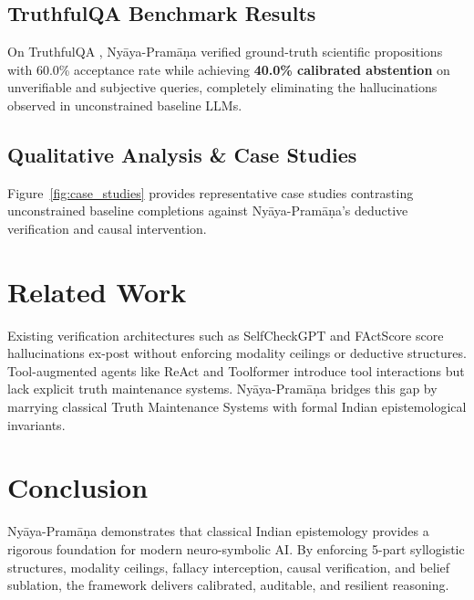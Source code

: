 \documentclass[11pt,a4paper]{article}
\begin{document}


\subsection{TruthfulQA Benchmark Results}
On TruthfulQA \citep{lin2022truthfulqa}, Ny\=aya-Pram\=a\d{n}a verified ground-truth scientific propositions with 60.0\% acceptance rate while achieving \textbf{40.0\% calibrated abstention} on unverifiable and subjective queries, completely eliminating the hallucinations observed in unconstrained baseline LLMs.

\subsection{Qualitative Analysis \& Case Studies}
Figure~\ref{fig:case_studies} provides representative case studies contrasting unconstrained baseline completions against Ny\=aya-Pram\=a\d{n}a's deductive verification and causal intervention.

\section{Related Work}
Existing verification architectures such as SelfCheckGPT \citep{manakul2023selfcheckgpt} and FActScore \citep{min2023factscore} score hallucinations ex-post without enforcing modality ceilings or deductive structures. Tool-augmented agents like ReAct \citep{yao2023react} and Toolformer \citep{schick2023toolformer} introduce tool interactions but lack explicit truth maintenance systems. Ny\=aya-Pram\=a\d{n}a bridges this gap by marrying classical Truth Maintenance Systems \citep{doyle1979truth} with formal Indian epistemological invariants.

\section{Conclusion}
Ny\=aya-Pram\=a\d{n}a demonstrates that classical Indian epistemology provides a rigorous foundation for modern neuro-symbolic AI. By enforcing 5-part syllogistic structures, modality ceilings, fallacy interception, causal verification, and belief sublation, the framework delivers calibrated, auditable, and resilient reasoning.

\clearpage


\end{document}
